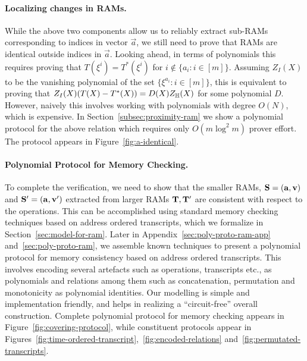 \paragraph{\bf Localizing changes in RAMs.} While the above two components allow us to reliably extract sub-RAMs
corresponding to indices in vector $\vec{a}$, we still need to prove that RAMs are identical outside indices in
$\vec{a}$. Looking ahead, in terms of polynomials this requires proving that $T(\xi^i)=T^*(\xi^i)$ for $i\not\in
\{a_i:i\in [m]\}$. Assuming $Z_I(X)$ to be the vanishing polynomial of the set $\{\xi^{a_i}:i\in [m]\}$,
this is equivalent to proving that $Z_I(X)(T(X) - T^*(X)) = D(X)Z_\mathbb{H}(X)$ for some polynomial $D$. However, naively
this involves working with polynomials with degree $O(N)$, which is expensive.
In Section~\ref{subsec:proximity-ram} we show a polynomial protocol for the above relation which requires only $O(m\log^2 m)$ prover effort. The protocol
appears in Figure~\ref{fig:a-identical}.

\paragraph{\bf Polynomial Protocol for Memory Checking.} To complete the verification, we need to show that
the smaller RAMs, $\mathbf{S}=(\mathbf{a},\mathbf{v})$ and $\mathbf{S}'=(\mathbf{a},\mathbf{v}')$ extracted from larger RAMs $\mathbf{T},\mathbf{T}'$
are consistent with respect to the operations. This can be accomplished using standard memory checking techniques
based on address ordered transcripts, which we formalize in Section~\ref{sec:model-for-ram}. Later in
Appendix~\ref{sec:poly-proto-ram-app} and~\ref{sec:poly-proto-ram}, we assemble known techniques to present
a polynomial protocol for memory consistency based on address ordered transcripts.
This involves encoding several artefacts such as operations, transcripts etc., as polynomials and relations
among them such as concatenation, permutation and monotonicity as polynomial identities. Our modelling is
simple and implementation friendly, and helps in realizing a ``circuit-free'' overall construction. Complete
polynomial protocol for memory checking appears in Figure~\ref{fig:covering-protocol}, while constituent protocols
appear in Figures~\ref{fig:time-ordered-transcript},~\ref{fig:encoded-relations} and~\ref{fig:permutated-transcripts}.

